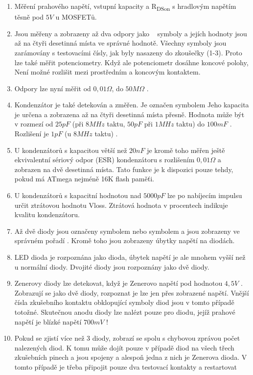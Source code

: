 \begin{enumerate}
\item Měření prahového napětí, vstupní kapacity a R\textsubscript{DSon} s hradlovým napětím těsně pod \(5V\) u MOSFETů.
\item Jsou měřeny a zobrazeny až dva odpory jako \mbox{~\electricR} symboly a jejích hodnoty
jsou až na čtyři desetinná místa ve správné hodnotě.
Všechny symboly jsou zarámovány s testovacími čísly, jak byly nasazeny do zkoušečky (1-3).
Proto lze také měřit potenciometry. Když ale potenciometr dosáhne koncové polohy,
Není možné rozlišit mezi prostředním a koncovým kontaktem.
\item Odpory lze nyní měřit od \(0,01\Omega\), do \(50M\Omega\) .
\item Kondenzátor je také detekován a změřen. Je označen symbolem \mbox{\electricC}
Jeho kapacita je určena a zobrazena až na čtyři desetinná místa přesně.
Hodnota může být v rozmezí od \(25pF\) (při \(8MHz\) taktu, \(50pF\) při \(1MHz\) taktu) do \(100mF\) .
Rozlišení je \(1pF\) (u \(8MHz\) taktu) .
\item U kondenzátorů s kapacitou větší než \(20nF\) je kromě toho měřen ještě ekvivalentní sériový odpor (ESR) kondenzátoru
s rozlišením \(0,01\Omega\) a zobrazen na dvě desetinná místa.
Tato funkce je k dispozici pouze tehdy, pokud má ATmega nejméně 16K flash paměťi.
\item U kondenzátorů s kapacitní hodnotou nad \(5000pF\) lze po nabíjecím impulsu určit ztrátovou hodnotu Vloss.
Ztrátová hodnota v procentech indikuje kvalitu kondenzátoru.
\item Až dvě diody jsou označeny symbolem \mbox{\electricDAK} nebo symbolem \mbox{\electricDKA}
a jsou zobrazeny ve správném pořadí .
Kromě toho jsou zobrazeny úbytky napětí na diodách.
\item LED dioda je rozpoznána jako dioda, úbytek napětí je ale mnohem vyšší než u normální diody.
Dvojité diody jsou rozpoznány jako dvě diody.
\item Zenerovy diody lze detekovat, když je Zenerovo napětí pod hodnotou \(4,5V\) .
Zobrazují se jako dvě diody, rozpoznat je lze jen přes zobrazené napětí.
Vnější čísla zkušebního kontaktu obklopující symboly diod jsou v tomto případě totožné.
Skutečnou anodu diody lze nalézt pouze pro diodu, jejíž prahové napětí je blízké napětí \(700mV\) !
\item Pokud se zjistí více než 3 diody, zobrazí se spolu s chybovou zprávou počet nalezených diod.
K tomu může dojít pouze v případě diod na všech třech zkušebních pinech a jsou spojeny a alespoň
jedna z nich je Zenerova dioda. V tomto případě je třeba připojit pouze dva testovací kontakty a restartovat

\end{enumerate}
